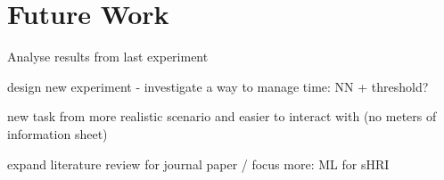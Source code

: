 \chapter{Future Work}

Analyse results from last experiment

design new experiment - investigate a way to manage time: NN + threshold?

new task from more realistic scenario and easier to interact with (no meters of information sheet)


expand literature review for journal paper / focus more: ML for sHRI


\cite{Thill2013}

